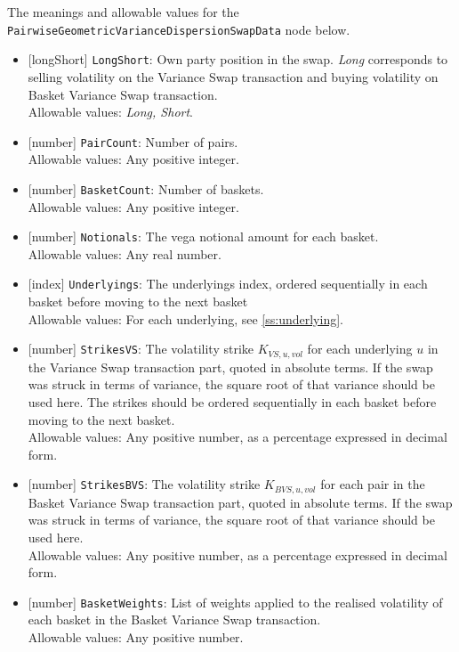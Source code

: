 The meanings and allowable values for the \lstinline!PairwiseGeometricVarianceDispersionSwapData! node below.

\begin{itemize}
  \item{}[longShort] \lstinline!LongShort!: Own party position in the swap. \emph{Long} corresponds to selling volatility on
  the Variance Swap transaction and buying volatility on Basket Variance Swap transaction. \\
  Allowable values: \emph{Long, Short}.
  \item{}[number] \lstinline!PairCount!: Number of pairs. \\
  Allowable values: Any positive integer.
  \item{}[number] \lstinline!BasketCount!: Number of baskets. \\
  Allowable values: Any positive integer.
  \item{}[number] \lstinline!Notionals!: The vega notional amount for each basket. \\
  Allowable values: Any real number.
  \item{}[index] \lstinline!Underlyings!: The underlyings index, ordered sequentially in each basket before moving to the next basket \\
  Allowable values: For each underlying, see \ref{ss:underlying}.
  \item{}[number] \lstinline!StrikesVS!: The volatility strike $K_{VS,u,vol}$ for each underlying $u$ in the Variance Swap transaction part, quoted in absolute terms. If the swap was
  struck in terms of variance, the square root of that variance should be used here. The strikes should be ordered sequentially in each basket before moving to the next basket.\\
  Allowable values: Any positive number, as a percentage expressed in decimal form.
  \item{}[number] \lstinline!StrikesBVS!: The volatility strike $K_{BVS,u,vol}$ for each pair in the Basket Variance Swap transaction part, quoted in absolute terms. If the swap was
  struck in terms of variance, the square root of that variance should be used here.\\
  Allowable values: Any positive number, as a percentage expressed in decimal form.
  \item{}[number] \lstinline!BasketWeights!: List of weights applied to the realised volatility of each basket in the Basket Variance Swap transaction. \\
  Allowable values: Any positive number.

\end{itemize}
